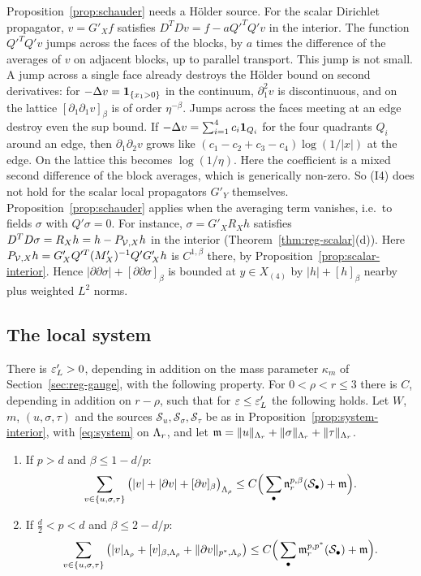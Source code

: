 \begin{remark}\label{rem:schauder-averaging}
Proposition~\ref{prop:schauder} needs a H\"older source. For the scalar Dirichlet propagator, $v=G'_Xf$ satisfies $D^TDv=f-aQ'^TQ'v$ in the interior. The function $Q'^TQ'v$ jumps across the faces of the blocks, by $a$ times the difference of the averages of $v$ on adjacent blocks, up to parallel transport. This jump is not small. A jump across a single face already destroys the H\"older bound on second derivatives: for $-\Delta v=\mathbf 1_{\{x_1>0\}}$ in the continuum, $\partial_1^2v$ is discontinuous, and on the lattice $[\partial_1\partial_1v]_\beta$ is of order $\eta^{-\beta}$. Jumps across the faces meeting at an edge destroy even the sup bound. If $-\Delta v=\sum_{i=1}^4c_i\mathbf 1_{Q_i}$ for the four quadrants $Q_i$ around an edge, then $\partial_1\partial_2v$ grows like $(c_1-c_2+c_3-c_4)\log(1/|x|)$ at the edge. On the lattice this becomes $\log(1/\eta)$. Here the coefficient is a mixed second difference of the block averages, which is generically non-zero. So (I4) does not hold for the scalar local propagators $G'_Y$ themselves. Proposition~\ref{prop:schauder} applies when the averaging term vanishes, i.e.\ to fields $\sigma$ with $Q'\sigma=0$. For instance, $\sigma=G'_XR_Xh$ satisfies $D^TD\sigma=R_Xh=h-P_{\mathcal V,X}h$ in the interior (Theorem~\ref{thm:reg-scalar}(d)). Here $P_{\mathcal V,X}h=G'_XQ'^T(M'_X)^{-1}Q'G'_Xh$ is $C^{1,\beta}$ there, by Proposition~\ref{prop:scalar-interior}. Hence $|\partial\partial\sigma|+[\partial\partial\sigma]_\beta$ is bounded at $y\in X_{(4)}$ by $|h|+[h]_\beta$ nearby plus weighted $L^2$ norms.
\end{remark}

\subsection{The local system}

\begin{proposition}\label{prop:system-lp}
There is $\varepsilon_L'>0$, depending in addition on the mass parameter $\kappa_m$ of Section~\ref{sec:reg-gauge}, with the following property. For $0<\rho<r\le3$ there is $C$, depending in addition on $r-\rho$, such that for $\varepsilon\le\varepsilon_L'$ the following holds. Let $W$, $m$, $(u,\sigma,\tau)$ and the sources $\mathcal S_u,\mathcal S_\sigma,\mathcal S_\tau$ be as in Proposition~\ref{prop:system-interior}, with \eqref{eq:system} on $\Lambda_r$, and let $\mathfrak m=\|u\|_{\Lambda_r}+\|\sigma\|_{\Lambda_r}+\|\tau\|_{\Lambda_r}$.
\begin{enumerate}[label=(\alph*)]
\item If $p>d$ and $\beta\le1-d/p$:
\[
\sum_{v\in\{u,\sigma,\tau\}}\big(|v|+|\partial v|+[\partial v]_\beta\big)_{\Lambda_\rho}\le C\Big(\sum_\bullet\mathfrak n^{p,\beta}_r(\mathcal S_\bullet)+\mathfrak m\Big).
\]
\item If $\frac d2<p<d$ and $\beta\le2-d/p$:
\[
\sum_{v\in\{u,\sigma,\tau\}}\big(|v|_{\Lambda_\rho}+[v]_{\beta,\Lambda_\rho}+\|\partial v\|_{p^*,\Lambda_\rho}\big)\le C\Big(\sum_\bullet\mathfrak m^{p,p^*}_r(\mathcal S_\bullet)+\mathfrak m\Big).
\]
\end{enumerate}
\end{proposition}

